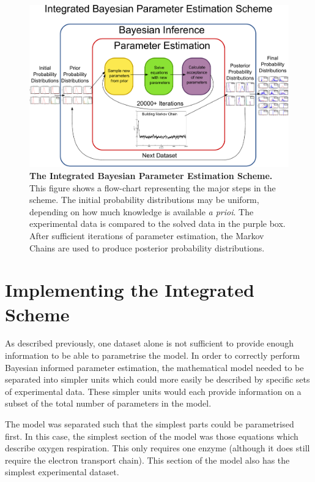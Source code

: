 \begin{figure}
 \centering
 \includegraphics[width=20.4cm]{./03-parameterestimationmethodologies/data/paramest.pdf}
 \caption[{The Integrated Bayesian Parameter Estimation Scheme}]{{\bf The Integrated Bayesian Parameter Estimation Scheme.} This figure shows a flow-chart representing the major steps in the scheme. The initial probability distributions may be uniform, depending on how much knowledge is available \textit{a prioi}. The experimental data is compared to the solved data in the purple box. After sufficient iterations of parameter estimation, the Markov Chains are used to produce posterior probability distributions.
 \label{fig:intscheme}}
\end{figure}

\section{Implementing the Integrated Scheme}
As described previously, one dataset alone is not sufficient to provide enough information to be able to parametrise the model. In order to correctly perform Bayesian informed parameter estimation, the mathematical model needed to be separated into simpler units which could more easily be described by specific sets of experimental data. These simpler units would each provide information on a subset of the total number of parameters in the model.

The model was separated such that the simplest parts could be parametrised first. In this case, the simplest section of the model was those equations which describe oxygen respiration. This only requires one enzyme (although it does still require the electron transport chain). This section of the model also has the simplest experimental dataset.

